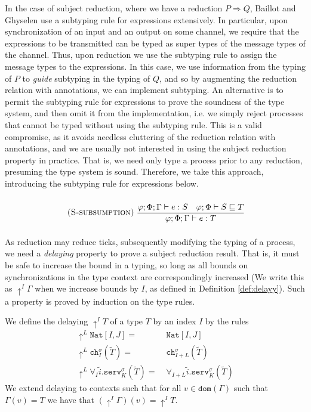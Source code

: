In the case of subject reduction, where we have a reduction $P \Longrightarrow Q$, Baillot and Ghyselen \cite{BaillotGhyselen2021} use a subtyping rule for expressions extensively. In particular, upon synchronization of an input and an output on some channel, we require that the expressions to be transmitted can be typed as super types of the message types of the channel. Thus, upon reduction we use the subtyping rule to assign the message types to the expressions. In this case, we use information from the typing of $P$ to \textit{guide} subtyping in the typing of $Q$, and so by augmenting the reduction relation with annotations, we can implement subtyping. An alternative is to permit the subtyping rule for expressions to prove the soundness of the type system, and then omit it from the implementation, i.e. we simply reject processes that cannot be typed without using the subtyping rule. This is a valid compromise, as it avoids needless cluttering of the reduction relation with annotations, and we are usually not interested in using the subject reduction property in practice. That is, we need only type a process prior to any reduction, presuming the type system is sound. Therefore, we take this approach, introducing the subtyping rule for expressions below.
\begin{align*}
    \runa{S-subsumption}\;\infrule{\varphi;\Phi;\Gamma\vdash e : S\quad \varphi;\Phi\vdash S \sqsubseteq T}{\varphi;\Phi;\Gamma\vdash e : T}
\end{align*}
As reduction may reduce ticks, subsequently modifying the typing of a process, we need a \textit{delaying} property to prove a subject reduction result. That is, it must be safe to increase the bound in a typing, so long as all bounds on synchronizations in the type context are correspondingly increased (We write this as $\uparrow^I\!\!\Gamma$ when we increase bounds by $I$, as defined in Definition \ref{def:delayy}). Such a property is proved by induction on the type rules.
%
\begin{defi}[Delaying]\label{def:delayy}
We define the delaying $\uparrow^I\!\!T$ of a type $T$ by an index $I$ by the rules 
\begin{align*}
    \uparrow^L\!\!\texttt{Nat}[I,J] =&\; \texttt{Nat}[I,J]\\
    \uparrow^L\!\!\texttt{ch}^\sigma_I(\widetilde{T}) =&\; \texttt{ch}^\sigma_{I+L}(\widetilde{T})\\
    \uparrow^L\!\!\forall_I\widetilde{i}.\texttt{serv}^\sigma_K(\widetilde{T}) =&\; \forall_{I+L}\widetilde{i}.\texttt{serv}^\sigma_K(\widetilde{T})
\end{align*}
We extend delaying to contexts such that for all $v\in\texttt{dom}(\Gamma)$ such that $\Gamma(v)=T$ we have that $(\uparrow^I\!\!\Gamma)(v)=\uparrow^I\!\!T$.
\end{defi}

